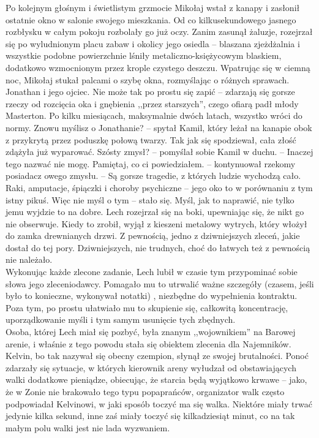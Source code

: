 \documentclass[../MAIN.tex]{subfiles}
\begin{document}
Po kolejnym głośnym i świetlistym grzmocie Mikołaj wstał z kanapy i zasłonił ostatnie okno w salonie swojego mieszkania. Od co kilkusekundowego jasnego rozbłysku w całym pokoju rozbolały go już oczy.
Zanim zasunął żaluzje, rozejrzał się po wyludnionym placu zabaw i okolicy jego osiedla -- blaszana zjeżdżalnia i wszystkie podobne powierzchnie lśniły metaliczno-księżycowym blaskiem, dodatkowo wzmocnionym przez krople czystego deszczu. Wpatrując się w ciemną noc, Mikołaj stukał palcami o szybę okna, rozmyślając o różnych sprawach.\\
Jonathan i jego ojciec. Nie może tak po prostu się zapić -- zdarzają się gorsze rzeczy od rozcięcia oka i gnębienia ,,przez starszych'', czego ofiarą padł młody Masterton. Po kilku miesiącach, maksymalnie dwóch latach, wszystko wróci do normy.
\sx Znowu myślisz o Jonathanie? -- spytał Kamil, który leżał na kanapie obok z przykrytą przez poduszkę połową twarzy. 
\qd
Tak jak się spodziewał, cała złość zdążyła już wyparować.
\sx Szósty zmysł? -- pomyślał sobie Kamil w duchu. -- Inaczej tego nazwać nie mogę.
\xx Pamiętaj, co ci powiedziałem. -- kontynuował rzekomy posiadacz owego zmysłu. -- Są gorsze tragedie, z których ludzie wychodzą cało. Raki, amputacje, śpiączki i choroby psychiczne -- jego oko to w porównaniu z tym istny pikuś. Więc nie myśl o tym -- stało się. Myśl, jak to naprawić, nie tylko jemu wyjdzie to na dobre.
\qd
% 
% 
% 
Lech rozejrzał się na boki, upewniając się, że nikt go nie obserwuje. Kiedy to zrobił, wyjął z kieszeni metalowy wytrych, który włożył do zamka drewnianych drzwi. Z pewnością, jedno z dziwniejszych zleceń, jakie dostał do tej pory. Dziwniejszych, nie trudnych, choć do łatwych też z pewnością nie należało.\\
Wykonując każde zlecone zadanie, Lech lubił w czasie tym przypominać sobie słowa jego zleceniodawcy. Pomagało mu to utrwalić ważne szczegóły (czasem, jeśli było to konieczne, wykonywał notatki) , niezbędne do wypełnienia kontraktu. Poza tym, po prostu ułatwiało mu to skupienie się, całkowitą koncentrację, uporządkowanie myśli i tym samym usunięcie tych zbędnych.\\
Osoba, której Lech miał się pozbyć, była znanym ,,wojownikiem'' na Barowej arenie, i właśnie z tego powodu stała się obiektem zlecenia dla Najemników. Kelvin, bo tak nazywał się obecny czempion, słynął ze swojej brutalności. Ponoć zdarzały się sytuacje, w których kierownik areny wyłudzał od obstawiających walki dodatkowe pieniądze, obiecując, że starcia będą wyjątkowo krwawe -- jako, że w Zonie nie brakowało tego typu popaprańców, organizator walk często podpowiadał Kelvinowi, w jaki sposób toczyć ma się walka. Niektóre miały trwać jedynie kilka sekund, inne zaś miały toczyć się kilkadziesiąt minut, co na tak małym polu walki jest nie lada wyzwaniem.
\end{document}
